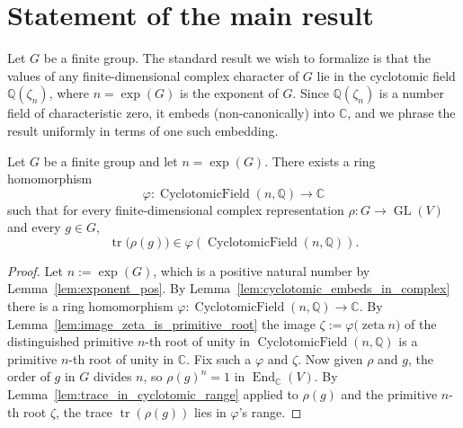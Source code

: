 


\section{Statement of the main result}

Let $G$ be a finite group. The standard result we wish to formalize is
that the values of any finite-dimensional complex character of $G$ lie
in the cyclotomic field $\mathbb{Q}(\zeta_n)$, where
$n = \operatorname{exp}(G)$ is the exponent of $G$. Since
$\mathbb{Q}(\zeta_n)$ is a number field of characteristic zero, it
embeds (non-canonically) into $\mathbb{C}$, and we phrase the result
uniformly in terms of one such embedding.

\begin{theorem}
    \label{thm:brauer_character_in_cyclotomic}
    Let $G$ be a finite group and let
    $n = \operatorname{exp}(G)$. There exists a ring homomorphism
    \[
        \varphi : \operatorname{CyclotomicField}(n,\mathbb{Q})
            \longrightarrow \mathbb{C}
    \]
    such that for every finite-dimensional complex representation
    $\rho : G \to \operatorname{GL}(V)$ and every $g \in G$,
    \[
        \operatorname{tr}\bigl(\rho(g)\bigr) \in \varphi(\operatorname{CyclotomicField}(n,\mathbb{Q})).
    \]
\end{theorem}
\begin{proof}
    Let $n := \operatorname{exp}(G)$, which is a positive natural
    number by Lemma~\ref{lem:exponent_pos}. By
    Lemma~\ref{lem:cyclotomic_embeds_in_complex} there is a ring
    homomorphism
    $\varphi : \operatorname{CyclotomicField}(n,\mathbb{Q}) \to \mathbb{C}$.
    By Lemma~\ref{lem:image_zeta_is_primitive_root} the image
    $\zeta := \varphi\bigl(\operatorname{zeta} n\bigr)$ of the
    distinguished primitive $n$-th root of unity in
    $\operatorname{CyclotomicField}(n,\mathbb{Q})$ is a primitive
    $n$-th root of unity in $\mathbb{C}$. Fix such a $\varphi$ and
    $\zeta$. Now given $\rho$ and $g$, the order of $g$ in $G$
    divides $n$, so $\rho(g)^n = 1$ in
    $\operatorname{End}_{\mathbb{C}}(V)$. By
    Lemma~\ref{lem:trace_in_cyclotomic_range} applied to $\rho(g)$
    and the primitive $n$-th root $\zeta$, the trace
    $\operatorname{tr}(\rho(g))$ lies in $\varphi$'s range.
\end{proof}

